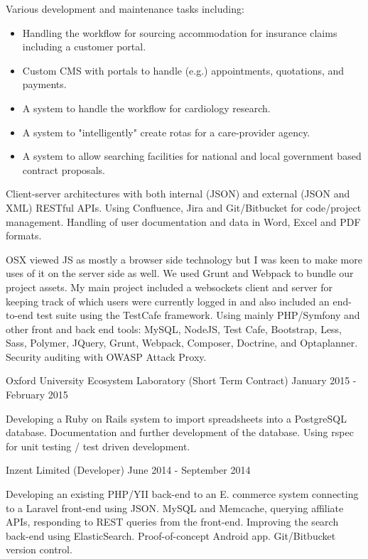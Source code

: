 Various development and maintenance tasks including:
\begin{itemize}
    \item Handling the workflow for sourcing accommodation for insurance claims including a customer portal.
    \item Custom CMS with portals to handle (e.g.) appointments, quotations, and payments.
    \item A system to handle the workflow for cardiology research.
    \item A system to "intelligently" create rotas for a care-provider agency.
    \item A system to allow searching facilities for national and local government based contract proposals.
\end{itemize}

Client-server architectures with both
internal (JSON) and external (JSON and XML) RESTful APIs.
Using Confluence, Jira and Git/Bitbucket for code/project management.
Handling of user documentation and data in Word, Excel and PDF formats.


\ifnum{}
    OSX viewed JS as mostly a browser side technology
    but I was keen to make more uses of it on the server side as well.
    We used Grunt and Webpack to bundle our project assets.
    My main project included a websockets client and server
    for keeping track of which users were currently logged in
    and also included an end-to-end test suite
    using the TestCafe framework.
\else
    Using mainly PHP/Symfony and other front and back end tools:
    MySQL, NodeJS, Test Cafe, Bootstrap, Less, Sass,
    Polymer, JQuery, Grunt, Webpack, Composer,
    Doctrine, and Optaplanner.
    Security auditing with OWASP Attack Proxy.
\fi

\jobHeading
    {Oxford University Ecosystem Laboratory (Short Term Contract)}
    {January 2015 - February 2015}

Developing a Ruby on Rails
system to import spreadsheets into a PostgreSQL database.
Documentation and further development of the database.
Using rspec for unit testing / test driven development.

\jobHeading
    {Inzent Limited (Developer)}
    {June 2014 - September 2014}

Developing an existing PHP/YII back-end to an
E. commerce system connecting to a Laravel front-end using JSON.
MySQL and Memcache, querying affiliate APIs,
responding to REST queries from the front-end.
Improving the search back-end using ElasticSearch.
Proof-of-concept Android app.
Git/Bitbucket version control.

